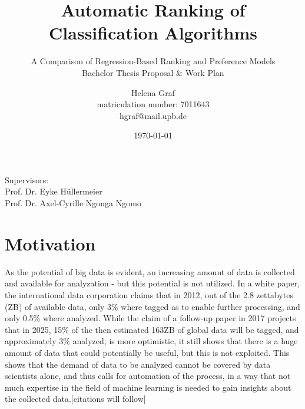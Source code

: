 \documentclass[12pt]{scrartcl}
\begin{document}
\title{Automatic Ranking of Classification Algorithms}
\subtitle{A Comparison of Regression-Based Ranking and Preference Models
\\\vspace{2em}Bachelor Thesis Proposal \& Work Plan}

\author{Helena Graf\\ 
\small{matriculation number: 7011643}\\ 
\small{hgraf@mail.upb.de}}
\date{\today}

\maketitle
\vspace{2em}

\begin{center}
\small{Supervisors:}\\
\large{Prof. Dr. Eyke H\"ullermeier}\\
\large{Prof. Dr. Axel-Cyrille Ngonga Ngomo}
\end{center}

\newpage
\tableofcontents
\newpage

\section{Motivation}\label{sec:motivation}
As the potential of big data is evident, an increasing amount of data is collected and available for analyzation - but this potential is not utilized. In a white paper, the international data corporation claims that in 2012, out of the 2.8 zettabytes (ZB) of available data, only 3\% where tagged as to enable further processing, and only 0.5\% where analyzed. While the claim of a follow-up paper in 2017 projects that in 2025, 15\% of the then estimated 163ZB of global data will be tagged, and approximately 3\% analyzed, is more optimistic, it still shows that there is a huge amount of data that could potentially be useful, but this is not exploited. This shows that the demand of data to be analyzed cannot be covered by data scientists alone, and thus calls for automation of the process, in a way that not much expertise in the field of machine learning is needed to gain insights about the collected data.[citations will follow]\\ %
\end{document}
